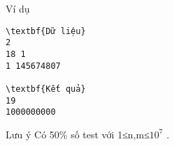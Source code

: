 Ví dụ
\begin{verbatim}
\textbf{Dữ liệu}
2
18 1
1 145674807	

\textbf{Kết quả}
19
1000000000
\end{verbatim}
Lưu ý
Có 50\% số test với 1≤n,m≤$10^{7}$   .